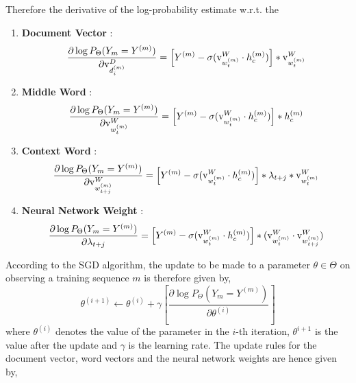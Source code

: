 Therefore the derivative of the log-probability estimate w.r.t. the 
\begin{enumerate}
\item
\textbf{Document Vector} : 
\begin{equation}
\label{eq:grad_doc}
\frac{\partial \log P_{\Theta}(Y_{m}=Y^{(m)})} {\partial \mathrm{v}^{D}_{d^{(m)}_{i}}} = \left[ Y^{(m)} - \sigma(\mathrm{v}^{W}_{w^{(m)}_{t}} \cdot h^{(m)}_{c})\right]* \mathrm{v}^{W}_{w^{(m)}_{t}}
\end{equation}
\item 
\textbf{Middle Word} : 
\begin{equation}
\label{eq:grad_mword}
\frac{\partial \log P_{\Theta}(Y_{m}=Y^{(m)})} {\partial \mathrm{v}^{W}_{w^{(m)}_{t}}} = \left[ Y^{(m)} - \sigma(\mathrm{v}^{W}_{w^{(m)}_{t}} \cdot h^{(m)}_{c})\right]* h^{(m)}_{c}
\end{equation}
\item 
\textbf{Context Word} : 
\begin{equation}
\label{eq:grad_cword}
\frac{\partial \log P_{\Theta}(Y_{m}=Y^{(m)})} {\partial \mathrm{v}^{W}_{w^{(m)}_{t+j}}} = \left[ Y^{(m)} - \sigma(\mathrm{v}^{W}_{w^{(m)}_{t}} \cdot h^{(m)}_{c})\right]* \lambda_{t+j}* \mathrm{v}^{W}_{w^{(m)}_{t}}
\end{equation}
\item 
\textbf{Neural Network Weight} : 
\begin{equation}
\label{eq:grad_wgt}
\frac{\partial \log P_{\Theta}(Y_{m}=Y^{(m)})} {\partial \lambda_{t+j}} = \left[ Y^{(m)} - \sigma(\mathrm{v}^{W}_{w^{(m)}_{t}} \cdot h^{(m)}_{c})\right]* (\mathrm{v}^{W}_{w^{(m)}_{t}} \cdot \mathrm{v}^{W}_{w^{(m)}_{t+j}})
\end{equation}
\end{enumerate}
According to the SGD algorithm, the update to be made to a parameter $\theta \in \Theta$ on observing a training sequence $m$ is therefore given by,
\begin{equation}
\theta^{(i+1)} \leftarrow \theta^{(i)} + \gamma \left[\frac{\partial \log P_{\Theta}(Y_{m} = Y^{(m)})}{\partial \theta^{(i)}} \right]
\end{equation}
where $\theta^{(i)}$ denotes the value of the parameter in the $i$-th iteration, $\theta^{i+1}$ is the value after the update and $\gamma$ is the learning rate. 
The update rules for the document vector, word vectors and the neural network weights are hence given by,
